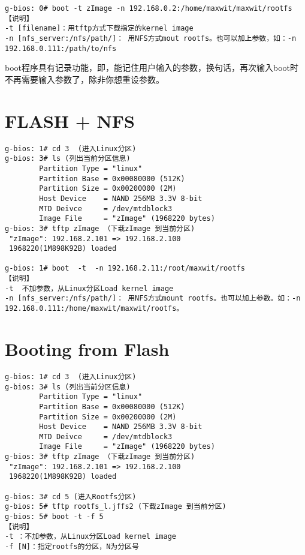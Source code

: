 \begin{verbatim}
g-bios: 0# boot -t zImage -n 192.168.0.2:/home/maxwit/maxwit/rootfs
【说明】
-t [filename]：用tftp方式下载指定的kernel image
-n [nfs_server:/nfs/path/]： 用NFS方式mout rootfs。也可以加上参数，如：-n 192.168.0.111:/path/to/nfs
\end{verbatim}

boot程序具有记录功能，即，能记住用户输入的参数，换句话，再次输入boot时不再需要输入参数了，除非你想重设参数。

\section{FLASH + NFS}
\begin{verbatim}
g-bios: 1# cd 3  (进入Linux分区)
g-bios: 3# ls (列出当前分区信息)
        Partition Type = "linux"
        Partition Base = 0x00080000 (512K)
        Partition Size = 0x00200000 (2M)
        Host Device    = NAND 256MB 3.3V 8-bit
        MTD Deivce     = /dev/mtdblock3
        Image File     = "zImage" (1968220 bytes)
g-bios: 3# tftp zImage （下载zImage 到当前分区)
 "zImage": 192.168.2.101 => 192.168.2.100
 1968220(1M898K92B) loaded

g-bios: 1# boot  -t  -n 192.168.2.11:/root/maxwit/rootfs
【说明】
-t  不加参数，从Linux分区Load kernel image
-n [nfs_server:/nfs/path/]： 用NFS方式mount rootfs。也可以加上参数。如：-n 192.168.0.111:/home/maxwit/maxwit/rootfs。
\end{verbatim}

\section{Booting from Flash}

\begin{verbatim}
g-bios: 1# cd 3  (进入Linux分区)
g-bios: 3# ls (列出当前分区信息)
        Partition Type = "linux"
        Partition Base = 0x00080000 (512K)
        Partition Size = 0x00200000 (2M)
        Host Device    = NAND 256MB 3.3V 8-bit
        MTD Deivce     = /dev/mtdblock3
        Image File     = "zImage" (1968220 bytes)
g-bios: 3# tftp zImage （下载zImage 到当前分区)
 "zImage": 192.168.2.101 => 192.168.2.100
 1968220(1M898K92B) loaded

g-bios: 3# cd 5 (进入Rootfs分区)
g-bios: 5# tftp rootfs_l.jffs2 (下载zImage 到当前分区)
g-bios: 5# boot -t -f 5
【说明】
-t ：不加参数，从Linux分区Load kernel image
-f [N]：指定rootfs的分区，N为分区号
\end{verbatim}
